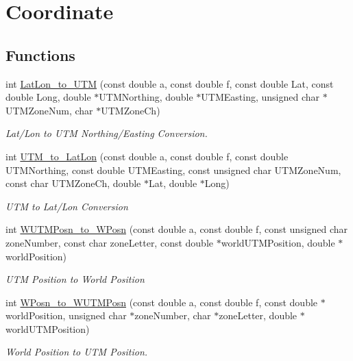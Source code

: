 \hypertarget{group__Coordinate}{
\section{Coordinate}
\label{group__Coordinate}
}
\subsection*{Functions}
\begin{CompactItemize}
\item 
int \hyperlink{group__Coordinate_g6c1e48485dd1ac536a1545f7b62c82df}{LatLon\_\-to\_\-UTM} (const double a, const double f, const double Lat, const double Long, double $\ast$UTMNorthing, double $\ast$UTMEasting, unsigned char $\ast$UTMZoneNum, char $\ast$UTMZoneCh)
\begin{CompactList}\small\item\em Lat/Lon to UTM Northing/Easting Conversion. \item\end{CompactList}\item 
int \hyperlink{group__Coordinate_gc09942cce14db1739c8441e4cca8a5a6}{UTM\_\-to\_\-LatLon} (const double a, const double f, const double UTMNorthing, const double UTMEasting, const unsigned char UTMZoneNum, const char UTMZoneCh, double $\ast$Lat, double $\ast$Long)
\begin{CompactList}\small\item\em UTM to Lat/Lon Conversion \item\end{CompactList}\item 
int \hyperlink{group__Coordinate_gf60ade188e07bb724c798fbaca99b002}{WUTMPosn\_\-to\_\-WPosn} (const double a, const double f, const unsigned char zoneNumber, const char zoneLetter, const double $\ast$worldUTMPosition, double $\ast$worldPosition)
\begin{CompactList}\small\item\em UTM Position to World Position \item\end{CompactList}\item 
int \hyperlink{group__Coordinate_g243a9a9ac70866ba4d4513d353058e92}{WPosn\_\-to\_\-WUTMPosn} (const double a, const double f, const double $\ast$worldPosition, unsigned char $\ast$zoneNumber, char $\ast$zoneLetter, double $\ast$worldUTMPosition)
\begin{CompactList}\small\item\em World Position to UTM Position. \item\end{CompactList}\item 

\end{CompactItemize}
